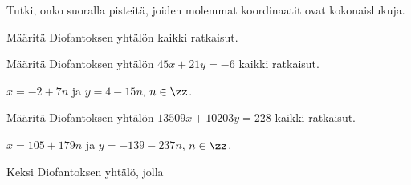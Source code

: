 \begin{tehtavasivu}
\begin{tehtava}
    Tutki, onko suoralla
    pisteitä, joiden molemmat koordinaatit ovat kokonaislukuja.

    \begin{vastaus}
    \end{vastaus}
    
\end{tehtava}

\begin{tehtava}
    Määritä Diofantoksen yhtälön kaikki ratkaisut.
    

    \begin{vastaus}
    \end{vastaus}
    
\end{tehtava}

\begin{tehtava}
    Määritä Diofantoksen yhtälön $45x + 21y = -6$ kaikki ratkaisut.

    \begin{vastaus}
        $x = -2 + 7n$ ja $y = 4 - 15n$, $n\in\zz$.
    \end{vastaus}
    
\end{tehtava}

\begin{tehtava}
    Määritä Diofantoksen yhtälön $13509x + 10203y = 228$ kaikki ratkaisut.
    
    \begin{vastaus}
        $x = 105 + 179n$ ja $y = -139 - 237n$, $n\in\zz$.
    \end{vastaus}
    
\end{tehtava}

\begin{tehtava}
    Keksi Diofantoksen yhtälö, jolla

    \begin{vastaus}
    \end{vastaus}
    

\end{tehtava}
\end{tehtavasivu}
